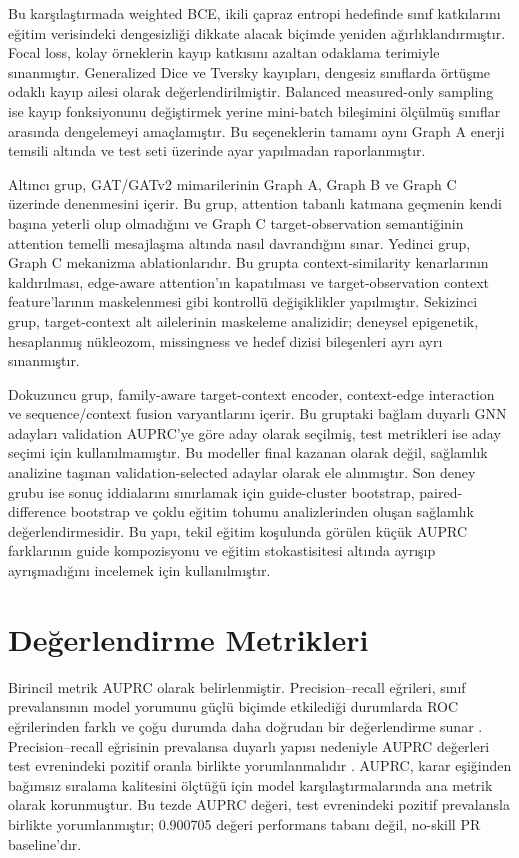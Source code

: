 Bu karşılaştırmada weighted BCE, ikili çapraz entropi hedefinde sınıf katkılarını eğitim verisindeki dengesizliği dikkate alacak biçimde yeniden ağırlıklandırmıştır. Focal loss, kolay örneklerin kayıp katkısını azaltan odaklama terimiyle sınanmıştır. Generalized Dice ve Tversky kayıpları, dengesiz sınıflarda örtüşme odaklı kayıp ailesi olarak değerlendirilmiştir. Balanced measured-only sampling ise kayıp fonksiyonunu değiştirmek yerine mini-batch bileşimini ölçülmüş sınıflar arasında dengelemeyi amaçlamıştır. Bu seçeneklerin tamamı aynı Graph A enerji temsili altında ve test seti üzerinde ayar yapılmadan raporlanmıştır.

Altıncı grup, GAT/GATv2 mimarilerinin Graph A, Graph B ve Graph C üzerinde denenmesini içerir. Bu grup, attention tabanlı katmana geçmenin kendi başına yeterli olup olmadığını ve Graph C target-observation semantiğinin attention temelli mesajlaşma altında nasıl davrandığını sınar. Yedinci grup, Graph C mekanizma ablationlarıdır. Bu grupta context-similarity kenarlarının kaldırılması, edge-aware attention'ın kapatılması ve target-observation context feature'larının maskelenmesi gibi kontrollü değişiklikler yapılmıştır. Sekizinci grup, target-context alt ailelerinin maskeleme analizidir; deneysel epigenetik, hesaplanmış nükleozom, missingness ve hedef dizisi bileşenleri ayrı ayrı sınanmıştır.

Dokuzuncu grup, family-aware target-context encoder, context-edge interaction ve sequence/context fusion varyantlarını içerir. Bu gruptaki bağlam duyarlı GNN adayları validation AUPRC'ye göre aday olarak seçilmiş, test metrikleri ise aday seçimi için kullanılmamıştır. Bu modeller final kazanan olarak değil, sağlamlık analizine taşınan validation-selected adaylar olarak ele alınmıştır. Son deney grubu ise sonuç iddialarını sınırlamak için guide-cluster bootstrap, paired-difference bootstrap ve çoklu eğitim tohumu analizlerinden oluşan sağlamlık değerlendirmesidir. Bu yapı, tekil eğitim koşulunda görülen küçük AUPRC farklarının guide kompozisyonu ve eğitim stokastisitesi altında ayrışıp ayrışmadığını incelemek için kullanılmıştır.

\section{Değerlendirme Metrikleri}

Birincil metrik AUPRC olarak belirlenmiştir. Precision--recall eğrileri, sınıf prevalansının model yorumunu güçlü biçimde etkilediği durumlarda ROC eğrilerinden farklı ve çoğu durumda daha doğrudan bir değerlendirme sunar . Precision--recall eğrisinin prevalansa duyarlı yapısı nedeniyle AUPRC değerleri test evrenindeki pozitif oranla birlikte yorumlanmalıdır . AUPRC, karar eşiğinden bağımsız sıralama kalitesini ölçtüğü için model karşılaştırmalarında ana metrik olarak korunmuştur. Bu tezde AUPRC değeri, test evrenindeki pozitif prevalansla birlikte yorumlanmıştır; 0.900705 değeri performans tabanı değil, no-skill PR baseline'dır.


